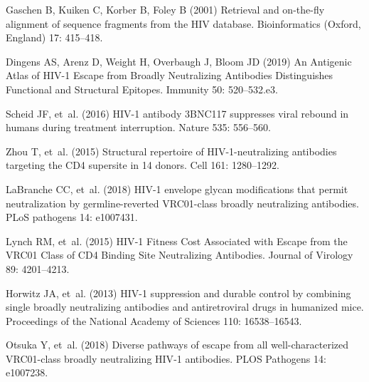 \documentclass[11pt]{article}
\begin{document}
{\begin{thebibliography}{10}
Gaschen B, Kuiken C, Korber B, Foley B (2001) Retrieval and on-the-fly
  alignment of sequence fragments from the {{HIV}} database.
\newblock Bioinformatics (Oxford, England) 17: 415--418.

Dingens AS, Arenz D, Weight H, Overbaugh J, Bloom JD (2019) {An Antigenic Atlas
  of HIV-1 Escape from Broadly Neutralizing Antibodies Distinguishes Functional
  and Structural Epitopes}.
\newblock Immunity 50: 520--532.e3.

Scheid JF, et~al. (2016) {{HIV}}-1 antibody {{3BNC117}} suppresses viral
  rebound in humans during treatment interruption.
\newblock Nature 535: 556--560.

Zhou T, et~al. (2015) Structural repertoire of {{HIV}}-1-neutralizing
  antibodies targeting the {{CD4}} supersite in 14 donors.
\newblock Cell 161: 1280--1292.

LaBranche CC, et~al. (2018) {{HIV}}-1 envelope glycan modifications that permit
  neutralization by germline-reverted {{VRC01}}-class broadly neutralizing
  antibodies.
\newblock PLoS pathogens 14: e1007431.

Lynch RM, et~al. (2015) {{HIV}}-1 {{Fitness Cost Associated}} with {{Escape}}
  from the {{VRC01 Class}} of {{CD4 Binding Site Neutralizing Antibodies}}.
\newblock Journal of Virology 89: 4201--4213.

Horwitz JA, et~al. (2013) {{HIV}}-1 suppression and durable control by
  combining single broadly neutralizing antibodies and antiretroviral drugs in
  humanized mice.
\newblock Proceedings of the National Academy of Sciences 110: 16538--16543.

Otsuka Y, et~al. (2018) Diverse pathways of escape from all well-characterized
  {{VRC01}}-class broadly neutralizing {{HIV}}-1 antibodies.
\newblock PLOS Pathogens 14: e1007238.


\end{thebibliography}}
\end{document}
